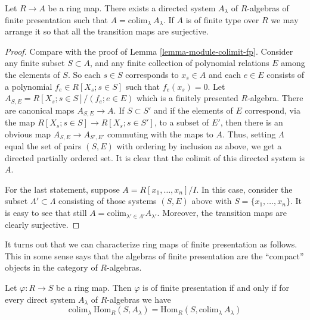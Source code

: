 \begin{lemma}
\label{lemma-ring-colimit-fp}
Let $R \to A$ be a ring map.
There exists a directed system $A_\lambda$ of
$R$-algebras of finite presentation such that
$A = \text{colim}_\lambda\ A_\lambda$.
If $A$ is of finite type over $R$ we may
arrange it so that all the transition maps
are surjective.
\end{lemma}

\begin{proof}
Compare with the proof of Lemma \ref{lemma-module-colimit-fp}.
Consider any finite subset $S \subset A$, and any finite
collection of polynomial relations $E$ among the elements of $S$.
So each $s \in S$ corresponds to $x_s \in A$ and
each $e \in E$ consists of a polynomial
$f_{e} \in R[X_s; s\in S]$ such that $f_e(x_s) = 0$.
Let $A_{S,E} = R[X_s; s\in S]/(f_e; e\in E)$
which is a finitely presented $R$-algebra.
There are canonical maps $A_{S,E} \to A$.
If $S \subset S'$ and if the elements of
$E$ correspond, via the map $R[X_s; s \in S] \to R[X_s; s\in S']$,
to a subset of $E'$, then there is an obvious map
$A_{S,E} \to A_{S', E'}$ commuting with the
maps to $A$. Thus, setting $\Lambda$ equal the set of pairs 
$(S,E)$ with ordering by inclusion as above, we get a
directed partially ordered set.
It is clear that the colimit of this directed system is $A$.

\medskip\noindent
For the last statement, suppose $A = R[x_1, \ldots, x_n]/I$.
In this case, consider the subset $\Lambda' \subset \Lambda$
consisting of those systems $(S, E)$ above
with $S = \{x_1, \ldots, x_n\}$. It is easy to see that
still $A = \text{colim}_{\lambda' \in \Lambda'} A_{\lambda'}$.
Moreover, the transition maps are clearly surjective.
\end{proof}

\noindent
It turns out that we can characterize ring maps of finite
presentation as follows. This in some sense says that the
algebras of finite presentation are the ``compact'' objects
in the category of $R$-algebras.

\begin{lemma}
\label{lemma-characterize-finite-presentation}
Let $\varphi : R \to S$ be a ring map.
Then $\varphi$ is of finite presentation if and only if
for every direct system $A_\lambda$ of $R$-algebras
we have
$$
\text{colim}_\lambda\ \text{Hom}_R(S, A_\lambda)
=
\text{Hom}_R(S, \text{colim}_\lambda\ A_\lambda)
$$
\end{lemma}


